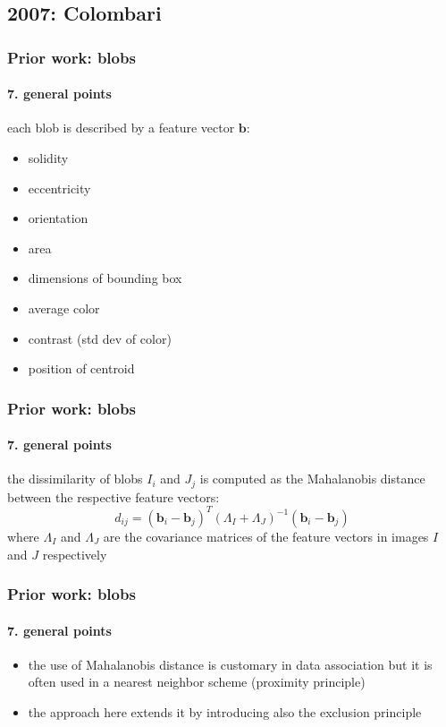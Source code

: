 \subsection{2007: Colombari}
\begin{frame}
\frametitle{Prior work: blobs}
\framesubtitle{7. general points}
\mypagenum
{}
	each blob is described by a feature vector $\mathbf{b}$:
	\begin{itemize}
		\item solidity
		\item eccentricity
		\item orientation
		\item area
		\item dimensions of bounding box
		\item average color
		\item contrast (std dev of color)
		\item position of centroid
	\end{itemize}
\end{frame}


\begin{frame}
\frametitle{Prior work: blobs}
\framesubtitle{7. general points}
\mypagenum
{}
	the dissimilarity of blobs $I_i$ and $J_j$ is computed as the Mahalanobis distance between the respective feature vectors:
	\begin{equation*}
		d_{ij} = (\mathbf{b}_i-\mathbf{b}_j)^T(\Lambda_I + \Lambda_J)^{-1}(\mathbf{b}_i-\mathbf{b}_j)
	\end{equation*}
	where $\Lambda_I$ and $\Lambda_J$ are the covariance matrices of the feature vectors in images $I$ and $J$ respectively
\end{frame}


\begin{frame}
\frametitle{Prior work: blobs}
\framesubtitle{7. general points}
\mypagenum
{}
	\begin{itemize}
		\item the use of Mahalanobis distance is customary in data association  but it is often used in a nearest neighbor scheme ({\color{blue}proximity principle})
		\item the approach here extends it by introducing also the {\color{blue} exclusion principle}
	\end{itemize}
\end{frame}




